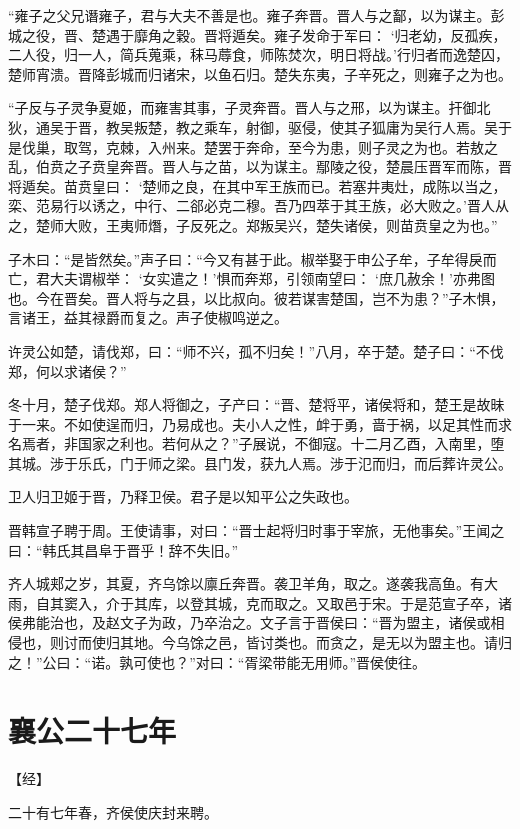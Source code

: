 \documentclass[a4paper,12pt,UTF8,twoside]{ctexbook}
\begin{document}
“雍子之父兄谮雍子，君与大夫不善是也。雍子奔晋。晋人与之鄐，以为谋主。彭城之役，晋、楚遇于靡角之穀。晋将遁矣。雍子发命于军曰： ‘归老幼，反孤疾，二人役，归一人，简兵蒐乘，秣马蓐食，师陈焚次，明日将战。’行归者而逸楚囚，楚师宵溃。晋降彭城而归诸宋，以鱼石归。楚失东夷，子辛死之，则雍子之为也。

“子反与子灵争夏姬，而雍害其事，子灵奔晋。晋人与之邢，以为谋主。扞御北狄，通吴于晋，教吴叛楚，教之乘车，射御，驱侵，使其子狐庸为吴行人焉。吴于是伐巢，取驾，克棘，入州来。楚罢于奔命，至今为患，则子灵之为也。若敖之乱，伯贲之子贲皇奔晋。晋人与之苗，以为谋主。鄢陵之役，楚晨压晋军而陈，晋将遁矣。苗贲皇曰： ‘楚师之良，在其中军王族而已。若塞井夷灶，成陈以当之，栾、范易行以诱之，中行、二郤必克二穆。吾乃四萃于其王族，必大败之。’晋人从之，楚师大败，王夷师熸，子反死之。郑叛吴兴，楚失诸侯，则苗贲皇之为也。”

子木曰：“是皆然矣。”声子曰：“今又有甚于此。椒举娶于申公子牟，子牟得戾而亡，君大夫谓椒举： ‘女实遣之！’惧而奔郑，引领南望曰： ‘庶几赦余！’亦弗图也。今在晋矣。晋人将与之县，以比叔向。彼若谋害楚国，岂不为患？”子木惧，言诸王，益其禄爵而复之。声子使椒鸣逆之。

许灵公如楚，请伐郑，曰：“师不兴，孤不归矣！”八月，卒于楚。楚子曰：“不伐郑，何以求诸侯？”

冬十月，楚子伐郑。郑人将御之，子产曰：“晋、楚将平，诸侯将和，楚王是故昧于一来。不如使逞而归，乃易成也。夫小人之性，衅于勇，啬于祸，以足其性而求名焉者，非国家之利也。若何从之？”子展说，不御寇。十二月乙酉，入南里，堕其城。涉于乐氏，门于师之梁。县门发，获九人焉。涉于氾而归，而后葬许灵公。

卫人归卫姬于晋，乃释卫侯。君子是以知平公之失政也。

晋韩宣子聘于周。王使请事，对曰：“晋士起将归时事于宰旅，无他事矣。”王闻之曰：“韩氏其昌阜于晋乎！辞不失旧。”

齐人城郏之岁，其夏，齐乌馀以廪丘奔晋。袭卫羊角，取之。遂袭我高鱼。有大雨，自其窦入，介于其库，以登其城，克而取之。又取邑于宋。于是范宣子卒，诸侯弗能治也，及赵文子为政，乃卒治之。文子言于晋侯曰：“晋为盟主，诸侯或相侵也，则讨而使归其地。今乌馀之邑，皆讨类也。而贪之，是无以为盟主也。请归之！”公曰：“诺。孰可使也？”对曰：“胥梁带能无用师。”晋侯使往。

\chapter{襄公二十七年}



【经】

二十有七年春，齐侯使庆封来聘。
\end{document}
